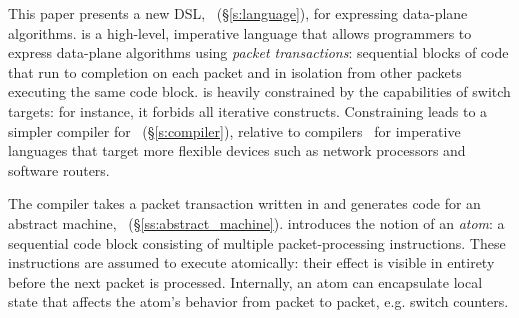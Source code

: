 



This paper presents a new DSL, \pktlanguage~(\S\ref{s:language}), for
expressing data-plane algorithms. \pktlanguage is a high-level, imperative
language that allows programmers to express data-plane algorithms using {\em
packet transactions}: sequential blocks of code that run to completion on each
packet and in isolation from other packets executing the same code block.
\pktlanguage is heavily constrained by the capabilities of switch targets: for
instance, it forbids all iterative constructs. Constraining \pktlanguage leads
to a simpler compiler for \pktlanguage~(\S\ref{s:compiler}), relative to
compilers~\cite{ixp} for imperative languages that target more flexible devices
such as network processors and software routers.

The \pktlanguage compiler takes a packet transaction written in \pktlanguage
and generates code for an abstract machine,
\absmachine~(\S\ref{ss:abstract_machine}).  \absmachine introduces the notion
of an \textit{atom}: a sequential code block consisting of multiple
packet-processing instructions. These instructions are assumed to execute
atomically: their effect is visible in entirety before the next packet is
processed. Internally, an atom can encapsulate local state that affects the
atom's behavior from packet to packet, e.g.  switch counters.

